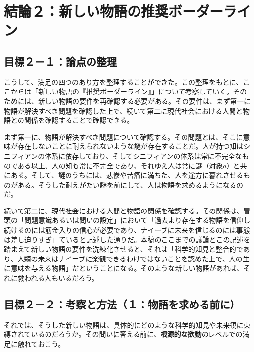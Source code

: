 \section{結論２：新しい物語の推奨ボーダーライン}\label{ux7d50ux8ad6uxff12ux65b0ux3057ux3044ux7269ux8a9eux306eux63a8ux5968ux30dcux30fcux30c0ux30fcux30e9ux30a4ux30f3}

\subsection{目標２－１：論点の整理}\label{ux76eeux6a19uxff12uxff11ux8ad6ux70b9ux306eux6574ux7406}

こうして、満足の四つのあり方を整理することができた。この整理をもとに、ここからは「新しい物語の『推奨ボーダーライン』」について考察していく。そのためには、新しい物語の要件を再確認する必要がある。その要件は、まず第一に物語が解決すべき問題を確認した上で、続いて第二に現代社会における人間と物語との関係を確認することで確認できる。

まず第一に、物語が解決すべき問題について確認する。その問題とは、そこに意味が存在しないことに耐えられないような謎が存在することだ。人が持つ知はシニフィアンの体系に依存しており、そしてシニフィアンの体系は常に不完全なものである以上、人の知も常に不完全であり、それゆえ人は常に謎（対象\(a\)）と共にある。そして、謎のうちには、悲惨や苦痛に満ちた、人を途方に暮れさせるものがある。そうした耐えがたい謎を前にして、人は物語を求めるようになるのだ。

続いて第二に、現代社会における人間と物語の関係を確認する。その関係は、冒頭の「問題意識あるいは問いの設定」において「過去より存在する物語を信仰し続けるのには筋金入りの信心が必要であり、ナイーブに未来を信じるのには事態は差し迫りすぎ」ていると記述した通りだ。本稿のここまでの議論とこの記述を踏まえて新しい物語の要件を洗練化させると、それは「科学的知見と整合的であり、人類の未来はナイーブに楽観できるわけではないことを認めた上で、人の生に意味を与える物語」だということになる。そのような新しい物語があれば、それに救われる人もいるだろう。

\subsection{目標２－２：考察と方法（１：物語を求める前に）}\label{ux76eeux6a19uxff12uxff12ux8003ux5bdfux3068ux65b9ux6cd5uxff11ux7269ux8a9eux3092ux6c42ux3081ux308bux524dux306b}

それでは、そうした新しい物語は、具体的にどのような科学的知見や未来観に束縛されているのだろうか。その問いに答える前に、\textbf{根源的な欲動}のレベルでの満足に触れておこう。

